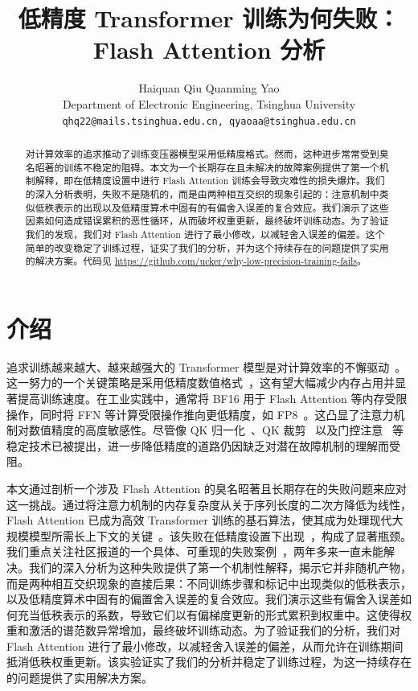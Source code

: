 \documentclass{article} %
\title{低精度 Transformer 训练为何失败：Flash Attention 分析}
\author{Haiquan Qiu  \quad Quanming Yao\\
Department of Electronic Engineering, Tsinghua University\\
\texttt{qhq22@mails.tsinghua.edu.cn, qyaoaa@tsinghua.edu.cn}
}
\begin{document}
\maketitle

\begin{abstract}
对计算效率的追求推动了训练变压器模型采用低精度格式。然而，这种进步常常受到臭名昭著的训练不稳定的阻碍。本文为一个长期存在且未解决的故障案例提供了第一个机制解释，即在低精度设置中进行 Flash Attention 训练会导致灾难性的损失爆炸。我们的深入分析表明，失败不是随机的，而是由两种相互交织的现象引起的：注意机制中类似低秩表示的出现以及低精度算术中固有的有偏舍入误差的复合效应。我们演示了这些因素如何造成错误累积的恶性循环，从而破坏权重更新，最终破坏训练动态。为了验证我们的发现，我们对 Flash Attention 进行了最小修改，以减轻舍入误差的偏差。这个简单的改变稳定了训练过程，证实了我们的分析，并为这个持续存在的问题提供了实用的解决方案。代码见 \url{https://github.com/ucker/why-low-precision-training-fails}。
\end{abstract}


\section{介绍}



追求训练越来越大、越来越强大的 Transformer 模型是对计算效率的不懈驱动~\citep{brown2020language,hoffmann2022training}。这一努力的一个关键策略是采用低精度数值格式~\citep{micikevicius2017mixed,wang2018training,kalamkar2019study,liu2024deepseek}，这有望大幅减少内存占用并显著提高训练速度。在工业实践中，通常将 BF16 用于 Flash Attention 等内存受限操作，同时将 FFN 等计算受限操作推向更低精度，如 FP8~\citep{liu2024deepseek,qwen3technicalreport}。这凸显了注意力机制对数值精度的高度敏感性。尽管像 QK 归一化~\citep{henry2020query,qwen3technicalreport}、QK 裁剪~\citep{team2025kimi} 以及门控注意~\citep{qiu2025gated,qwen3technicalreport} 等稳定技术已被提出，进一步降低精度的道路仍因缺乏对潜在故障机制的理解而受阻。


本文通过剖析一个涉及 Flash Attention 的臭名昭著且长期存在的失败问题来应对这一挑战。通过将注意力机制的内存复杂度从关于序列长度的二次方降低为线性，Flash Attention 已成为高效 Transformer 训练的基石算法，使其成为处理现代大规模模型所需长上下文的关键~\citep{dao2022flashattention,dao2023flashattention2,shah2024flashattention}。该失败在低精度设置下出现~\citep{flash-attention_issue337,nanogpt_issue303,nanogpt_issue524,nanogpt_issue554,lee2024fp8,golden2024flash}，构成了显著瓶颈。我们重点关注社区报道的一个具体、可重现的失败案例~\citep{nanogpt_issue303,nanogpt_issue524}，两年多来一直未能解决。我们的深入分析为这种失败提供了第一个机制性解释，揭示它并非随机产物，而是两种相互交织现象的直接后果：不同训练步骤和标记中出现类似的低秩表示，以及低精度算术中固有的偏置舍入误差的复合效应。我们演示这些有偏舍入误差如何充当低秩表示的系数，导致它们以有偏梯度更新的形式累积到权重中。这使得权重和激活的谱范数异常增加，最终破坏训练动态。为了验证我们的分析，我们对 Flash Attention 进行了最小修改，以减轻舍入误差的偏差，从而允许在训练期间抵消低秩权重更新。该实验证实了我们的分析并稳定了训练过程，为这一持续存在的问题提供了实用解决方案。
\end{document}
